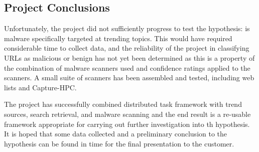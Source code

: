 \subsection{Project Conclusions}

Unfortunately, the project did not sufficiently progress to test the hypothesis:
is malware specifically targeted at trending topics. This would have required
considerable time to collect data, and the reliability of the project in
classifying URLs as malicious or benign has not yet been determined as this is a
property of the combination of malware scanners used and confidence ratings
applied to the scanners. A small suite of scanners has been assembled and
tested, including web lists and Capture-HPC.

The project has successfully combined distributed task framework with trend
sources, search retrieval, and malware scanning and the end result is a
re-usable framework appropriate for carrying out further investigation into th
hypothesis. It is hoped that some data collected and a preliminary conclusion to
the hypothesis can be found in time for the final presentation to the customer.
 
